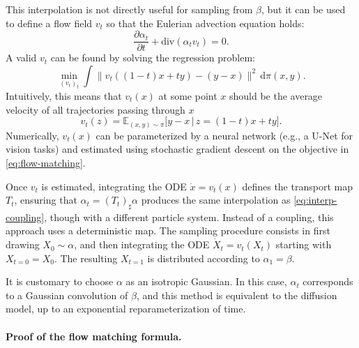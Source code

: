 This interpolation is not directly useful for sampling from $\beta$, but it can be used to define a flow field $v_t$ so that the Eulerian advection equation holds:
\begin{equation}
    \frac{\partial \alpha_t}{\partial t} + \mathrm{div}(\alpha_t v_t) = 0. \label{eq:eulerian-advection}
\end{equation}
A valid $v_t$ can be found by solving the regression problem:
\begin{equation}
    \min_{(v_t)_t} \int \|v_t((1-t)x + ty) - (y - x)\|^2 \, \mathrm{d}\pi(x, y). \label{eq:flow-matching}
\end{equation}
Intuitively, this means that $v_t(x)$ at some point $x$ should be the average velocity of all trajectories passing through $x$
\begin{equation}\label{eq:flow-match-conditional}
		v_t(z) = \mathbb{E}_{(x, y) \sim \pi} \big[ y - x \, \big| \, z = (1-t)x + t y \big].
\end{equation}
Numerically, $v_t(x)$ can be parameterized by a neural network (e.g., a U-Net for vision tasks) and estimated using stochastic gradient descent on the objective in \eqref{eq:flow-matching}.

Once $v_t$ is estimated, integrating the ODE $\dot{x} = v_t(x)$ defines the transport map $T_t$, ensuring that $\alpha_t = (T_t)_\sharp \alpha$ produces the same interpolation as \eqref{eq:interp-coupling}, though with a different particle system. Instead of a coupling, this approach uses a deterministic map.
The sampling procedure consists in first drawing $X_0 \sim \alpha$, and then integrating the ODE $\dot{X}_t = v_t(X_t)$ starting with $X_{t=0} = X_0$. 
The resulting $X_{t=1}$ is distributed according to $\alpha_1 = \beta$.

It is customary to choose $\alpha$ as an isotropic Gaussian. In this case, $\alpha_t$ corresponds to a Gaussian convolution of $\beta$, and this method is equivalent to the diffusion model, up to an exponential reparameterization of time.

\paragraph{Proof of the flow matching formula.}

